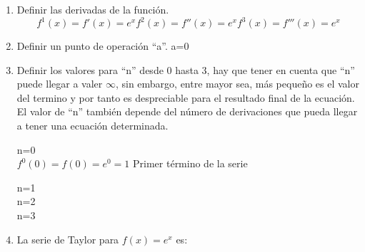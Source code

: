 \documentclass[a4paper,12pt,twoside]{proyectotanquesecci}
\begin{document}
\begin{enumerate}

\item Definir las derivadas de la función.
	\begin{equation}
	f^{1}\left( x\right) =f'\left( x\right) =e^{x}
	f^{2}\left( x\right) =f''\left( x\right) =e^{x}
	f^{3}\left( x\right) =f'''\left( x\right) =e^{x}
	\end{equation}
\item Definir un punto de operación “a”.
	a=0
\item Definir los valores para “n” desde 0 hasta 3, hay que tener en cuenta que “n” puede llegar a valer $\infty$, sin embargo, entre mayor sea, más pequeño es el valor del termino y por tanto es despreciable para el resultado final de la ecuación. El valor de “n” también depende del número de derivaciones que pueda llegar a tener una ecuación determinada.

	n=0 \\
	$f^{0}\left( 0\right) =f\left( 0\right) =e^{0}=1$ Primer término de la serie
	
	n=1 \\
	
	
	n=2 \\
	
	
	n=3 \\
	
	
\item La serie de Taylor para $f(x)=e^{x}$ es:
\end{enumerate}
\end{document}
